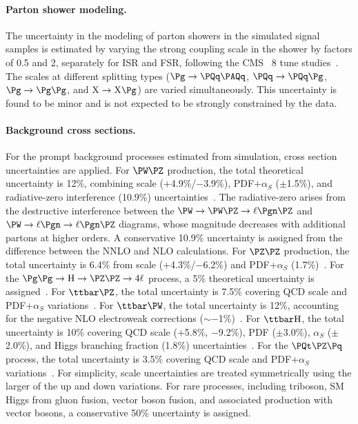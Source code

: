 \paragraph{Parton shower modeling.}
The uncertainty in the modeling of parton showers in the simulated signal samples is estimated by varying the strong coupling scale in the shower by factors of 0.5 and 2, separately for ISR and FSR, following the CMS \PYTHIA~8 tune studies~\cite{CMS:2019csb}. The scales at different splitting types ($\Pg \to \PQq\PAQq$, $\PQq \to \PQq\Pg$, $\Pg \to \Pg\Pg$, and $\mathrm{X} \to \mathrm{X}\Pg$) are varied simultaneously. This uncertainty is found to be minor and is not expected to be strongly constrained by the data.

\paragraph{Background cross sections.}
For the prompt background processes estimated from simulation, cross section uncertainties are applied. For $\PW\PZ$ production, the total theoretical uncertainty is 12\%, combining scale (+4.9\%/$-$3.9\%), PDF+$\alpha_{S}$ ($\pm$1.5\%), and radiative-zero interference (10.9\%) uncertainties~\cite{WZNNLOCalc}. The radiative-zero arises from the destructive interference between the $\PW \to \PW\PZ \to \ell\Pgn\PZ$ and $\PW \to \ell\Pgn \to \ell\Pgn\PZ$ diagrams, whose magnitude decreases with additional partons at higher orders. A conservative 10.9\% uncertainty is assigned from the difference between the NNLO and NLO calculations. For $\PZ\PZ$ production, the total uncertainty is 6.4\% from scale (+4.3\%/$-$6.2\%) and PDF+$\alpha_{S}$ (1.7\%)~\cite{ZZNNLOCalc}. For the $\Pg\Pg \to \PH \to \PZ\PZ \to 4\ell$ process, a 5\% theoretical uncertainty is assigned~\cite{YR4}. For $\ttbar\PZ$, the total uncertainty is 7.5\% covering QCD scale and PDF+$\alpha_{S}$ variations~\cite{ttZaN3LO}. For $\ttbar\PW$, the total uncertainty is 12\%, accounting for the negative NLO electroweak corrections ($\sim$$-$1\%)~\cite{ttWaN3LO,ttWEW}. For $\ttbar\PH$, the total uncertainty is 10\% covering QCD scale (+5.8\%, $-$9.2\%), PDF ($\pm$3.0\%), $\alpha_{S}$ ($\pm$2.0\%), and Higgs branching fraction (1.8\%) uncertainties~\cite{YR4}. For the $\PQt\PZ\Pq$ process, the total uncertainty is 3.5\% covering QCD scale and PDF+$\alpha_{S}$ variations~\cite{tZqNLO}. For simplicity, scale uncertainties are treated symmetrically using the larger of the up and down variations. For rare processes, including triboson, SM Higgs from gluon fusion, vector boson fusion, and associated production with vector bosons, a conservative 50\% uncertainty is assigned.

